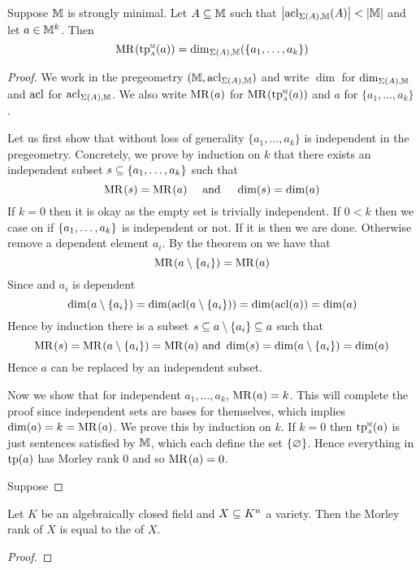 \begin{prop}
    Suppose $\mathbb{M}$ is strongly minimal. %
    Let $A \subseteq \mathbb{M}$ such that $\left\vert \operatorname{acl}_{\Sigma(A),\mathbb{M}}(A) \right\vert < \left\vert \mathbb{M} \right\vert$ 
    and let $a \in \mathbb{M}^k$. Then 
    \[\MR{}{\subintp{A}{\M}{\tp}(a)} = \dim_{\Si(A),\M}(\{a_1,\dots,a_k\})\]
\end{prop}
\begin{proof}
    We work in the pregeometry $(\mathbb{M},\operatorname{acl}_{\Sigma(A),\mathbb{M}})$ and write 
    $\dim$ for $\dim_{\Sigma(A),\mathbb{M}}$ and $\operatorname{acl}$ for $\operatorname{acl}_{\Sigma(A),\mathbb{M}}$.
    We also write $\mathrm{MR}^{}(a)$ for $\MR{}{\subintp{A}{\M}{\tp}(a)}$
    and $a$ for $\{a_1,\dots,a_k\}$.

    Let us first show that without loss of generality 
    $\{a_1,\dots,a_k\}$ is independent in the pregeometry.
    Concretely, we prove by induction on $k$ that there exists an independent
    subset $s \subseteq \left\{a_1,\dots,a_k\right\}$ such that 
    \[\mathrm{MR}^{}(s) = \mathrm{MR}^{}(a) \quad \text{ and } \quad \dim(s) = \dim(a)\]
    If $k = 0$ then it is okay as the empty set is trivially independent.
    If $0 < k$ then we case on if $\left\{a_1,\dots,a_k\right\}$ is independent
    or not.
    If it is then we are done. 
    Otherwise remove a dependent element $a_i$.
    By the theorem on  we have that 
    \[\mathrm{MR}^{}(a \setminus \left\{a_i\right\}) = \mathrm{MR}^{}(a)\]
    Since 
    and $a_i$ is dependent
    \[
        \dim(a \setminus \left\{a_i\right\}) = \dim(\operatorname{acl}(a \setminus \left\{a_i\right\}))
        = \dim(\operatorname{acl}(a)) = \dim(a)
    \]
    Hence by induction there is a subset $s \subseteq a \setminus \left\{a_i\right\} \subseteq a$
    such that 
    \[\mathrm{MR}^{}(s) = \mathrm{MR}^{}(a \setminus \left\{a_i\right\}) = \mathrm{MR}^{}(a)
    \text{ and } \dim(s) = \dim(a \setminus \left\{a_i\right\}) = \dim(a)\]
    Hence $a$ can be replaced by an independent subset.

    Now we show that for independent $a_1,\dots,a_k$, $\mathrm{MR}^{}(a) = k$.
    This will complete the proof since independent sets 
    are bases for themselves, which implies $\dim(a) = k = \mathrm{MR}^{}(a)$.
    We prove this by induction on $k$.
    If $k = 0$ then $\subintp{A}{\M}{\tp}(a)$ 
    is just sentences satisfied by $\mathbb{M}$, 
    which  each define the set 
    $\left\{\varnothing\right\}$. 
    Hence everything in $\operatorname{tp}(a)$ has Morley rank $0$ and so $\mathrm{MR}^{}(a) = 0$.

    Suppose 
    
\end{proof}

\begin{prop}
    Let $K$ be an algebraically closed field and $X \subseteq K^n$ a variety.
    Then the Morley rank of $X$ is equal to the 
     of $X$.
\end{prop}
\begin{proof}
    
\end{proof}